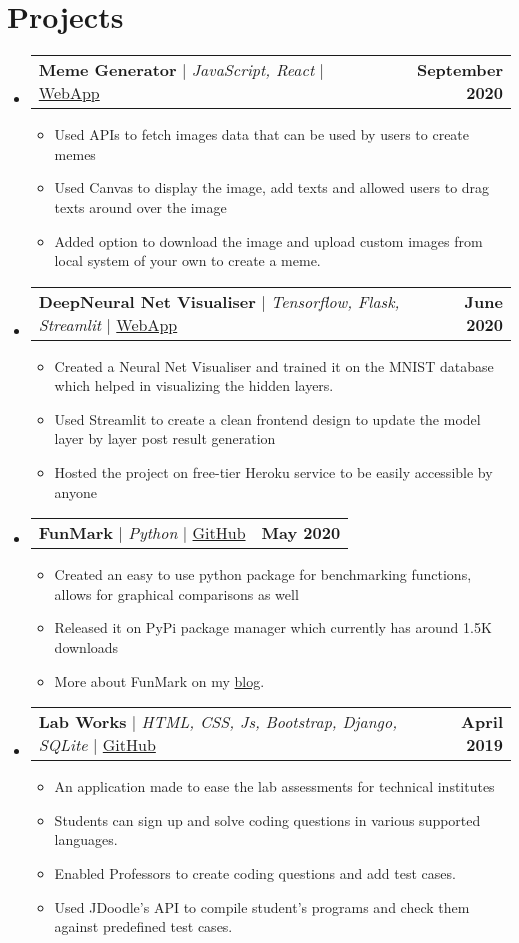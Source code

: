 \documentclass[letterpaper,11pt]{article}
\makeatletter
\newcommand{\resumeItem}[1]{
  \item\small{
    {#1 \vspace{-2pt}}
  }
}
\newcommand{\resumeProjectHeading}[2]{
    \item
    \begin{tabular*}{1.001\textwidth}{l@{\extracolsep{\fill}}r}
      \small#1 & \textbf{\small #2} \\
    \end{tabular*}\vspace{-7pt}
}
\newcommand{\resumeSubHeadingListStart}{\begin{itemize}[leftmargin=0.0in, label={}]}
\newcommand{\resumeSubHeadingListEnd}{\end{itemize}}
\newcommand{\resumeItemListStart}{\justify \begin{itemize}}
\newcommand{\resumeItemListEnd}{\end{itemize}\vspace{-2pt}}
\makeatother
\begin{document}
\section{Projects}
    \vspace{-5pt}
    \resumeSubHeadingListStart
        \resumeProjectHeading
            {\textbf{Meme Generator} $|$ \emph{JavaScript, React}  $|$ \href{https://jai-dewani.github.io/Meme-App/}{WebApp}}{September 2020}
            \resumeItemListStart
                \resumeItem{Used APIs to fetch images data that can be used by users to create memes}
                \resumeItem{Used Canvas to display the image, add texts and allowed users to drag texts around over the image}
                \resumeItem{Added option to download the image and upload custom images from local system of your own to create a meme.}
            \resumeItemListEnd
        \resumeProjectHeading
            {\textbf{DeepNeural Net Visualiser} $|$ \emph{Tensorflow, Flask, Streamlit} $|$ \href{https://visualize-neural-network.herokuapp.com/}{WebApp}}{June 2020} 
            \resumeItemListStart
                \resumeItem{Created a Neural Net Visualiser and trained it on the MNIST database which helped in visualizing the hidden layers.  }
                \resumeItem{Used Streamlit to create a clean frontend design to update the model layer by layer post result generation}
                \resumeItem{Hosted the project on free-tier Heroku service to be easily accessible by anyone}
            \resumeItemListEnd 
        \resumeProjectHeading
            {\textbf{FunMark} $|$ \emph{Python} $|$ \href{https://github.com/jai-dewani/fun-mark}{GitHub}}{May 2020} 
            \resumeItemListStart
                \resumeItem{Created an easy to use python package for benchmarking functions, allows for graphical comparisons as well}
                \resumeItem{Released it on PyPi package manager which currently has around 1.5K downloads}
                \resumeItem{More about FunMark on my \href{https://blogs.jaid.tech/fun-mark/}{blog}.}
            \resumeItemListEnd 
        \resumeProjectHeading
            {\textbf{Lab Works} $|$ \emph{HTML, CSS, Js, Bootstrap, Django, SQLite} $|$ \href{https://github.com/jai-dewani/Lab-Works}{GitHub}}{April 2019} 
            \resumeItemListStart
                \resumeItem{An  application  made  to  ease  the  lab  assessments  for  technical  institutes }
                \resumeItem{Students can sign up and solve coding questions in various supported languages.}
                \resumeItem{Enabled  Professors to  create coding questions and add test cases.}
                \resumeItem{Used JDoodle’s API to compile student’s programs and check them against predefined test cases.}
            \resumeItemListEnd 
    \resumeSubHeadingListEnd
\end{document}
